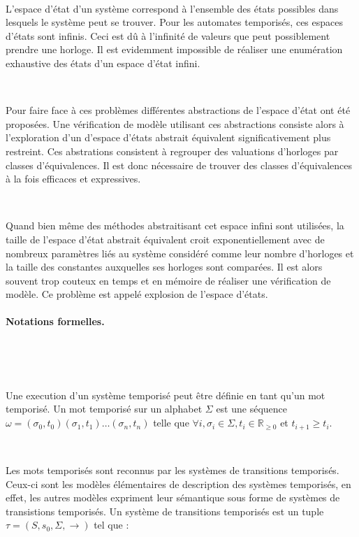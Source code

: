       ~

      L'espace d'état d'un système correspond à l'ensemble des états possibles
      dans lesquels le système peut se trouver. Pour les automates temporisés,
      ces espaces d'états sont infinis. Ceci est dû à l'infinité de valeurs que
      peut possiblement prendre une horloge. Il est evidemment impossible de
      réaliser une enumération exhaustive des états d'un espace d'état infini.

      ~

      Pour faire face à ces problèmes différentes abstractions de l'espace
      d'état ont été proposées. Une vérification de modèle utilisant ces
      abstractions consiste alors à l'exploration d'un d'espace d'états abstrait
      équivalent significativement plus restreint. Ces abstrations consistent à
      regrouper des valuations d'horloges par classes d'équivalences. Il est
      donc nécessaire de trouver des classes d'équivalences à la fois efficaces
      et expressives.

      ~

      Quand bien même des méthodes abstraitisant cet espace infini sont
      utilisées, la taille de l'espace d'état abstrait équivalent croit
      exponentiellement avec de nombreux paramètres liés au système considéré
      comme leur nombre d'horloges et la taille des constantes auxquelles ses
      horloges sont comparées. Il est alors souvent trop couteux en temps et en
      mémoire de réaliser une vérification de modèle. Ce problème est appelé
      explosion de l'espace d'états.

    \paragraph{Notations formelles.} ~

      ~

      Une execution d'un système temporisé peut être définie en
      tant qu'un mot temporisé. Un mot temporisé sur un alphabet $\Sigma$ est
      une séquence $\omega = (\sigma_0,t_0)(\sigma_1,t_1)\dots(\sigma_n,t_n)$
      telle que $\forall i, \sigma_i \in \Sigma, t_i \in \mathbb{R}_{\geq 0}$ et
      $t_{i+1} \geq t_i$.

      ~

      Les mots temporisés sont reconnus par les systèmes de transitions
      temporisés. Ceux-ci sont les modèles élémentaires de description des
      systèmes temporisés, en effet, les autres modèles expriment leur
      sémantique sous forme de systèmes de transistions temporisés.
      Un système de transitions temporisés est un tuple $\tau = (S, s_0, \Sigma,
      \rightarrow)$ tel que :

